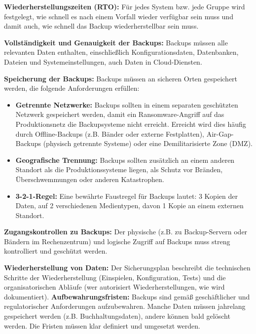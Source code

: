 \textbf{Wiederherstellungszeiten (RTO):} Für jedes System bzw. jede Gruppe wird festgelegt, wie schnell es nach einem Vorfall wieder verfügbar sein muss und damit auch, wie schnell das Backup wiederherstellbar sein muss.

\textbf{Vollständigkeit und Genauigkeit der Backups:} Backups müssen alle relevanten Daten enthalten, einschließlich Konfigurationsdaten, Datenbanken, Dateien und Systemeinstellungen, auch Daten in Cloud-Diensten.

\textbf{Speicherung der Backups:} Backups müssen an sicheren Orten gespeichert werden, die folgende Anforderungen erfüllen:
\begin{itemize}
    \item \textbf{Getrennte Netzwerke:} Backups sollten in einem separaten geschützten Netzwerk gespeichert werden, damit ein Ransomware-Angriff auf das Produktionsnetz die Backupsysteme nicht erreicht. Erreicht wird dies häufig durch Offline-Backups (z.B. Bänder oder externe Festplatten), Air-Gap-Backups (physisch getrennte Systeme) oder eine Demilitarisierte Zone (DMZ).
    \item \textbf{Geografische Trennung:} Backups sollten zusätzlich an einem anderen Standort als die Produktionssysteme liegen, als Schutz vor Bränden, Überschwemmungen oder anderen Katastrophen.
    \item \textbf{3-2-1-Regel:} Eine bewährte Faustregel für Backups lautet: 3 Kopien der Daten, auf 2 verschiedenen Medientypen, davon 1 Kopie an einem externen Standort.
\end{itemize}

\textbf{Zugangskontrollen zu Backups:} Der physische (z.B. zu Backup-Servern oder Bändern im Rechenzentrum) und logische Zugriff auf Backups muss streng kontrolliert und geschützt werden.

\textbf{Wiederherstellung von Daten:} Der Sicherungsplan beschreibt die technischen Schritte der Wiederherstellung (Einspielen, Konfiguration, Tests) und die organisatorischen Abläufe (wer autorisiert Wiederherstellungen, wie wird dokumentiert).
\newpage
\textbf{Aufbewahrungsfristen:} Backups sind gemäß geschäftlicher und regulatorischer Anforderungen aufzubewahren. Manche Daten müssen jahrelang gespeichert werden (z.B. Buchhaltungsdaten), andere können bald gelöscht werden. Die Fristen müssen klar definiert und umgesetzt werden.

